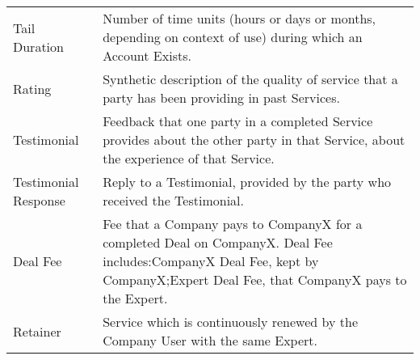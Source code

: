 \begin{longtable}{lp{7.5cm}}
Tail Duration              & Number of time units (hours or days or months, depending on context of use) during which an Account Exists.                                                                                                                                                                                                                                                               \\
Rating                     & Synthetic description of the quality of service that a party has been providing in past Services.                                                                                                                                                                                                                                                                         \\
Testimonial                & Feedback that one party in a completed Service provides about the other party in that Service, about the experience of that Service.                                                                                                                                                                                                                                      \\
Testimonial Response       & Reply to a Testimonial, provided by the party who received the Testimonial.                                                                                                                                                                                                                                                                                               \\
Deal Fee                   & Fee that a Company pays to CompanyX for a completed Deal on CompanyX. Deal Fee includes:CompanyX Deal Fee, kept by CompanyX;Expert Deal Fee, that CompanyX pays to the Expert.                                                                                                                                                                                            \\
Retainer                   & Service which is continuously renewed by the Company User with the same Expert.                                                                                                                                                                                                                                                                                           \\* \bottomrule
\end{longtable}

